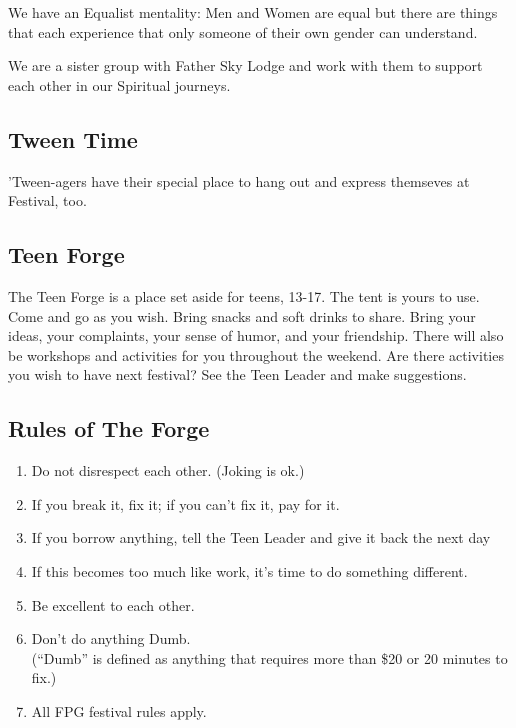 \documentclass[9pt,twoside,openright,final,article,letterpaper]{memoir}
\renewcommand{\pfbreakdisplay}{%
  \needspace{24pt}%
  \vspace{8pt}\\\ding{76}\quad\ding{77}\quad\ding{78}\\%
  \vspace{11pt}}
\let\oldsubsection=\subsection
\renewcommand{\subsection}[1]{%
  \vspace{6pt}
  \needspace{1.25in}
  \oldsubsection{#1}
  \nopagebreak}
\begin{document}
\begin{multicols}{2}
  We have an Equalist mentality: Men and Women are equal but there are
  things that each experience that only someone of their own gender can
  understand.

  We are a sister group with Father Sky Lodge and work with them to
  support each other in our Spiritual journeys.

  \endgroup




  \subsection{Tween Time}

  'Tween-agers have their special place to hang out and express
  themseves at Festival, too.

  \subsection{Teen Forge}

  The Teen Forge is a place set aside for teens, 13-17. The tent is
  yours to use. Come and go as you wish. Bring snacks and soft drinks to
  share. Bring your ideas, your complaints, your sense of humor, and
  your friendship. There will also be workshops and activities for you
  throughout the weekend. Are there activities you wish to have next
  festival? See the Teen Leader and make suggestions.

  \subsection{Rules of The Forge}

  \begin{enumerate}
  \item Do not disrespect each other. {\small (Joking is ok.)}
  \item If you break it, fix it; if you can’t fix it, pay for it.
  \item If you borrow anything, tell the Teen Leader and give it back
    the next day
  \item If this becomes too much like work, it's time to do
    something different.
  \item Be excellent to each other.
  \item Don’t do anything Dumb. \\
    {\small (``Dumb'' is defined as anything that requires more than
      \$20 or 20 minutes to fix.)}
  \item All FPG festival rules apply.
  \end{enumerate}


\end{multicols}
\end{document}
